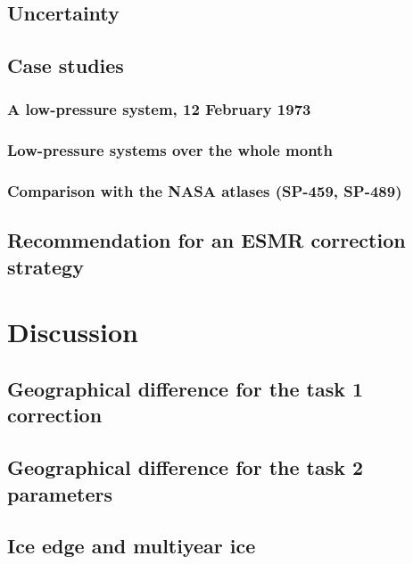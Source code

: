 \documentclass{article}
\begin{document}
\subsection{Uncertainty}

\subsection{Case studies}
\subsubsection{A low-pressure system, 12 February 1973}
\subsubsection{Low-pressure systems over the whole month}
\subsubsection{Comparison with the NASA atlases (SP-459, SP-489)}

\subsection{Recommendation for an ESMR correction strategy}

\section{Discussion}

\subsection{Geographical difference for the task 1 correction}

\subsection{Geographical difference for the task 2 parameters}

\subsection{Ice edge and multiyear ice}
\end{document}
